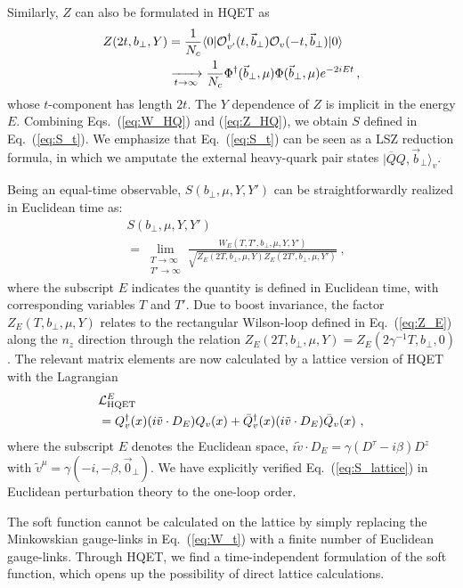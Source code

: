 \documentclass[aps,rmp,reprint,amsmath,amssymb,graphicx,longbibliography]{revtex4-1} %
\newcommand{\nn}{\nonumber}
\begin{document}
Similarly, $Z$ can also be formulated in HQET as
\begin{align}\label{eq:Z_HQ}
	Z(2t,b_\perp,Y)&=\frac{1}{N_c}\langle0|{\cal O}^\dagger_{v'}(t,{\vec b}_\perp){\cal O}_v(-t,\vec{b}_\perp)|0\rangle \nonumber\\
	&\xrightarrow[\substack{t\to\infty}]{}\frac{1}{N_c}\Phi^\dagger({\vec b}_\perp,\mu)\Phi({\vec b}_\perp,\mu)e^{-2iEt}\,,
\end{align}
whose $t$-component has length $2t$.
%
The $Y$ dependence of $Z$ is implicit in the energy $E$.
%
Combining Eqs.~(\ref{eq:W_HQ}) and (\ref{eq:Z_HQ}), we obtain $S$ defined in Eq.~(\ref{eq:S_t}). We emphasize that Eq.~(\ref{eq:S_t}) can be seen as a LSZ reduction formula, in which we amputate the external heavy-quark pair states $|\overline QQ,{\vec b}_\perp\rangle_v$.

Being an equal-time observable, $S(b_\perp,\mu,Y,Y')$ can be straightforwardly realized in Euclidean time as:
\begin{align}\label{eq:S_lattice}
	&S(b_\perp,\mu,Y,Y') \\
	&=\lim_{\substack{T\to\infty\\T'\to\infty}}\frac{W_E(T,T',b_\perp,\mu,Y,Y')}{\sqrt{Z_E(2T,b_\perp,\mu,Y)Z_E(2T',b_\perp,\mu,Y')}}  \ , \nn
\end{align}
where the subscript $E$ indicates the quantity is defined in Euclidean time, with corresponding
variables $T$ and $T'$. Due to boost invariance, the factor $Z_E(T,b_\perp,\mu,Y)$ relates to the rectangular Wilson-loop defined in Eq.~(\ref{eq:Z_E}) along the $n_z$ direction through the relation $Z_E(2T,b_\perp,\mu,Y)=Z_E(2\gamma^{-1}T,b_\perp,0)$.
%
The relevant matrix elements are now calculated by a lattice version of HQET with the Lagrangian~\cite{Aglietti:1993hf,Hashimoto:1995in,Horgan:2009ti}
\begin{align}\label{eq:L_HQ}
	&{\cal L}_{{\rm HQET}}^E  \\
	&=Q_v^\dagger(x) (i\tilde v\cdot D_E)Q_v(x)+\bar Q_v^\dagger(x) (i\tilde v\cdot D_E)\bar Q_v(x) \ , \nn
\end{align}
where the subscript $E$ denotes the Euclidean space, $i\tilde v\cdot D_E=\gamma(D^\tau-i\beta )D^z$ with $\tilde v^\mu=\gamma(-i,-\beta,\vec 0_\perp)$. We have explicitly verified Eq.~(\ref{eq:S_lattice}) in Euclidean perturbation theory to the one-loop order.

The soft function cannot be calculated on the lattice by simply replacing the Minkowskian gauge-links in Eq.~(\ref{eq:W_t}) with a finite number of Euclidean gauge-links. Through HQET, we find a time-independent formulation of the soft function, which opens up the possibility of direct lattice calculations.
\end{document}
